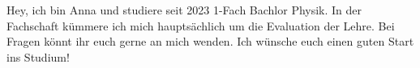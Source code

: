 \begin{multicols}{2}
{
Hey, ich bin Anna und studiere seit 2023 1-Fach Bachlor Physik. In der Fachschaft kümmere ich mich hauptsächlich um die Evaluation der Lehre. Bei Fragen könnt ihr euch gerne an mich wenden.
Ich wünsche euch einen guten Start ins Studium!
}

\vspace{0.5cm}


\end{multicols}
